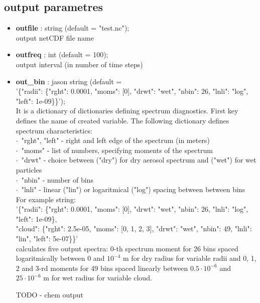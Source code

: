 \documentclass[11pt]{article}
\begin{document}
\subsection{output parametres}

\begin{itemize}
  \item \textbf{outfile} : string (default = "test.nc"); \\ output netCDF file name
  \item \textbf{outfreq} : int (default = 100); \\ output interval (in number of time steps)
  \item \textbf{out\_bin} : jason string (default =\\ '\{"radii": \{"rght": 0.0001, "moms": [0], "drwt": "wet", "nbin": 26, "lnli": "log", "left": 1e-09\}\}');\\

    \vspace{-.9em}
    It is a dictionary of dictionaries defining spectrum diagnostics.
    First key defines the name of created variable. The following dictionary defines spectrum characteristics:\\
      \indent $\cdot$\ "rght", "left" - right and left edge of the spectrum (in meters)\\
      \indent $\cdot$\ "moms" - list of numbers, specifying moments of the spectrum\\
      \indent $\cdot$\ "drwt" - choice between  ("dry") for dry aerosol spectrum and ("wet") for wet particles\\
      \indent $\cdot$\ "nbin" - number of bins\\
      \indent $\cdot$\ "lnli" - linear ("lin") or logaritmical ("log") spacing between between bins\\
 
    \vspace{-.9em}
    For example string: \\ 
  
    \vspace{-.9em}
    '\{"radii": \{"rght": 0.0001,  "moms": [0],          "drwt": "wet", "nbin": 26, "lnli": "log", "left": 1e-09\},\\ 
       "cloud": \{"rght": 2.5e-05, "moms": [0, 1, 2, 3], "drwt": "wet", "nbin": 49, "lnli": "lin", "left": 5e-07\}\}'\\ 
 
    \vspace{-.9em}
    calculates five output spectra:
      0-th spectrum moment for 26 bins spaced logaritmically between 0 and $10^{-4}$ m for dry radius for variable radii and 
      0, 1, 2 and 3-rd moments for 49 bins spaced linearly between $0.5\cdot10^{-6}$ and $25\cdot10^{-6}$ m for wet radius for variable cloud.

    TODO - chem output

\end{itemize}
\end{document}
